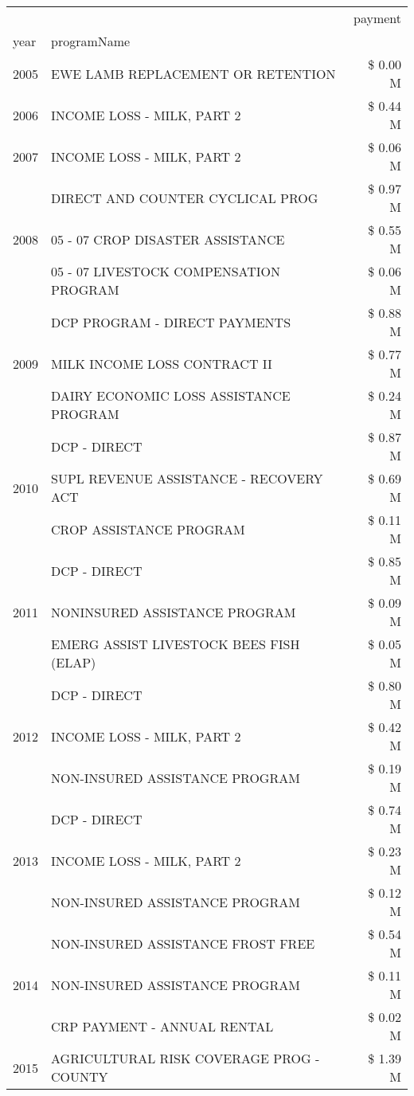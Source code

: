 \begin{tabular}{llr}
\toprule
 &  & payment \\
year & programName &  \\
\midrule
2005 & EWE LAMB REPLACEMENT OR RETENTION & \$ 0.00 M \\
\cline{1-3}
2006 & INCOME LOSS - MILK, PART 2 & \$ 0.44 M \\
\cline{1-3}
2007 & INCOME LOSS - MILK, PART 2 & \$ 0.06 M \\
\cline{1-3}
\multirow[t]{3}{*}{2008} & DIRECT AND COUNTER CYCLICAL PROG & \$ 0.97 M \\
 & 05 - 07 CROP DISASTER ASSISTANCE & \$ 0.55 M \\
 & 05 - 07 LIVESTOCK COMPENSATION PROGRAM & \$ 0.06 M \\
\cline{1-3}
\multirow[t]{3}{*}{2009} & DCP PROGRAM - DIRECT PAYMENTS & \$ 0.88 M \\
 & MILK INCOME LOSS CONTRACT II & \$ 0.77 M \\
 & DAIRY ECONOMIC LOSS ASSISTANCE PROGRAM & \$ 0.24 M \\
\cline{1-3}
\multirow[t]{3}{*}{2010} & DCP - DIRECT & \$ 0.87 M \\
 & SUPL REVENUE ASSISTANCE - RECOVERY ACT & \$ 0.69 M \\
 & CROP ASSISTANCE PROGRAM & \$ 0.11 M \\
\cline{1-3}
\multirow[t]{3}{*}{2011} & DCP - DIRECT & \$ 0.85 M \\
 & NONINSURED ASSISTANCE PROGRAM & \$ 0.09 M \\
 & EMERG ASSIST LIVESTOCK BEES FISH (ELAP) & \$ 0.05 M \\
\cline{1-3}
\multirow[t]{3}{*}{2012} & DCP - DIRECT & \$ 0.80 M \\
 & INCOME LOSS - MILK, PART 2 & \$ 0.42 M \\
 & NON-INSURED ASSISTANCE PROGRAM & \$ 0.19 M \\
\cline{1-3}
\multirow[t]{3}{*}{2013} & DCP - DIRECT & \$ 0.74 M \\
 & INCOME LOSS - MILK, PART 2 & \$ 0.23 M \\
 & NON-INSURED ASSISTANCE PROGRAM & \$ 0.12 M \\
\cline{1-3}
\multirow[t]{3}{*}{2014} & NON-INSURED ASSISTANCE FROST FREE & \$ 0.54 M \\
 & NON-INSURED ASSISTANCE PROGRAM & \$ 0.11 M \\
 & CRP PAYMENT - ANNUAL RENTAL & \$ 0.02 M \\
\cline{1-3}
\multirow[t]{3}{*}{2015} & AGRICULTURAL RISK COVERAGE PROG - COUNTY & \$ 1.39 M \\

\end{tabular}
